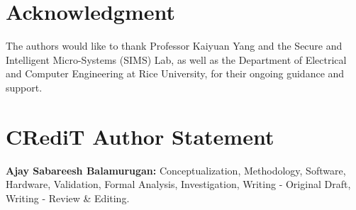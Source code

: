 \documentclass[journal]{IEEEtran}
\begin{document}
%







\section*{Acknowledgment}
The authors would like to thank Professor Kaiyuan Yang and the Secure and Intelligent Micro-Systems (SIMS) Lab, as well as the Department of Electrical and Computer Engineering at Rice University, for their ongoing guidance and support.

\ifCLASSOPTIONcaptionsoff
  \newpage
\fi

\section*{CRediT Author Statement}
\textbf{Ajay Sabareesh Balamurugan:} Conceptualization, Methodology, Software, Hardware, Validation, Formal Analysis, Investigation, Writing - Original Draft, Writing - Review \& Editing.



\end{document}
